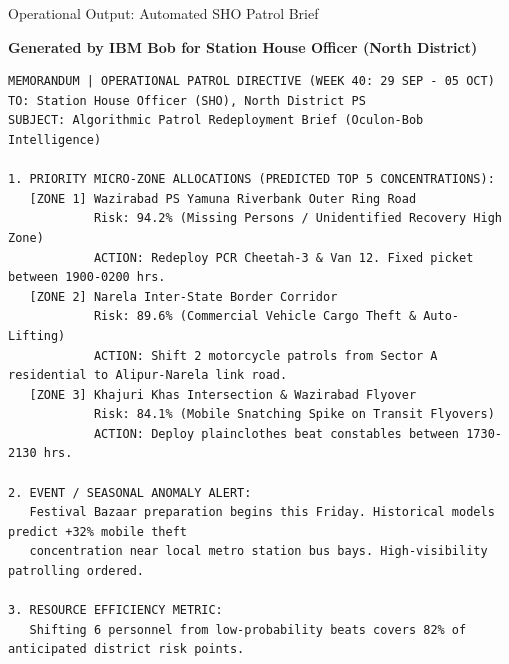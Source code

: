 \documentclass[aspectratio=169,10pt]{beamer}
\begin{document}
\begin{frame}[fragile]{Operational Output: Automated SHO Patrol Brief}
  \begin{block}{\textbf{Generated by IBM Bob for Station House Officer (North District)}}
\scriptsize
\begin{verbatim}
MEMORANDUM | OPERATIONAL PATROL DIRECTIVE (WEEK 40: 29 SEP - 05 OCT)
TO: Station House Officer (SHO), North District PS
SUBJECT: Algorithmic Patrol Redeployment Brief (Oculon-Bob Intelligence)

1. PRIORITY MICRO-ZONE ALLOCATIONS (PREDICTED TOP 5 CONCENTRATIONS):
   [ZONE 1] Wazirabad PS Yamuna Riverbank Outer Ring Road
            Risk: 94.2% (Missing Persons / Unidentified Recovery High Zone)
            ACTION: Redeploy PCR Cheetah-3 & Van 12. Fixed picket between 1900-0200 hrs.
   [ZONE 2] Narela Inter-State Border Corridor
            Risk: 89.6% (Commercial Vehicle Cargo Theft & Auto-Lifting)
            ACTION: Shift 2 motorcycle patrols from Sector A residential to Alipur-Narela link road.
   [ZONE 3] Khajuri Khas Intersection & Wazirabad Flyover
            Risk: 84.1% (Mobile Snatching Spike on Transit Flyovers)
            ACTION: Deploy plainclothes beat constables between 1730-2130 hrs.

2. EVENT / SEASONAL ANOMALY ALERT:
   Festival Bazaar preparation begins this Friday. Historical models predict +32% mobile theft
   concentration near local metro station bus bays. High-visibility patrolling ordered.

3. RESOURCE EFFICIENCY METRIC:
   Shifting 6 personnel from low-probability beats covers 82% of anticipated district risk points.
\end{verbatim}
  \end{block}
\end{frame}
\end{document}
